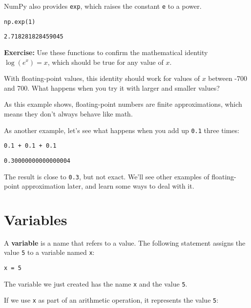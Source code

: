 NumPy also provides \passthrough{\lstinline!exp!}, which raises the
constant \passthrough{\lstinline!e!} to a power.

\begin{lstlisting}[]
np.exp(1)
\end{lstlisting}

\begin{lstlisting}[style=output]
2.718281828459045
\end{lstlisting}

\textbf{Exercise:} Use these functions to confirm the mathematical
identity \(\log(e^x) = x\), which should be true for any value of \(x\).

With floating-point values, this identity should work for values of
\(x\) between -700 and 700. What happens when you try it with larger and
smaller values?

As this example shows, floating-point numbers are finite approximations,
which means they don't always behave like math.

As another example, let's see what happens when you add up
\passthrough{\lstinline!0.1!} three times:

\begin{lstlisting}[]
0.1 + 0.1 + 0.1
\end{lstlisting}

\begin{lstlisting}[style=output]
0.30000000000000004
\end{lstlisting}

The result is close to \passthrough{\lstinline!0.3!}, but not exact.
We'll see other examples of floating-point approximation later, and
learn some ways to deal with it.

\hypertarget{variables}{%
\section{Variables}\label{variables}}

A \textbf{variable} is a name that refers to a value. The following
statement assigns the value \passthrough{\lstinline!5!} to a variable
named \passthrough{\lstinline!x!}:

\begin{lstlisting}[]
x = 5
\end{lstlisting}

The variable we just created has the name \passthrough{\lstinline!x!}
and the value \passthrough{\lstinline!5!}.

If we use \passthrough{\lstinline!x!} as part of an arithmetic
operation, it represents the value \passthrough{\lstinline!5!}:

